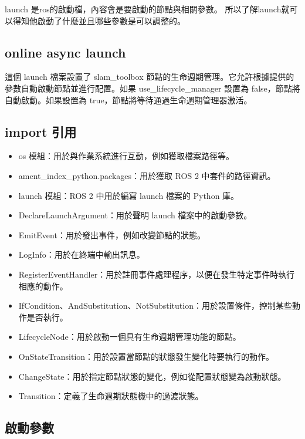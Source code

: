 launch 是ros的啟動檔，內容會是要啟動的節點與相關參數。
所以了解launch就可以得知他啟動了什麼並且哪些參數是可以調整的。
\subsection{online async launch}

這個 launch 檔案設置了 slam\_toolbox 節點的生命週期管理。它允許根據提供的參數自動啟動節點並進行配置。如果 use\_lifecycle\_manager 設置為 false，節點將自動啟動。如果設置為 true，節點將等待通過生命週期管理器激活。
\subsection{import 引用}
\begin{itemize}
    \item os 模組：用於與作業系統進行互動，例如獲取檔案路徑等。
    \item ament\_index\_python.packages：用於獲取 ROS 2 中套件的路徑資訊。
    \item launch 模組：ROS 2 中用於編寫 launch 檔案的 Python 庫。
    \item DeclareLaunchArgument：用於聲明 launch 檔案中的啟動參數。
    \item EmitEvent：用於發出事件，例如改變節點的狀態。
    \item LogInfo：用於在終端中輸出訊息。
    \item RegisterEventHandler：用於註冊事件處理程序，以便在發生特定事件時執行相應的動作。
    \item IfCondition、AndSubstitution、NotSubstitution：用於設置條件，控制某些動作是否執行。
    \item LifecycleNode：用於啟動一個具有生命週期管理功能的節點。
    \item OnStateTransition：用於設置當節點的狀態發生變化時要執行的動作。
    \item ChangeState：用於指定節點狀態的變化，例如從配置狀態變為啟動狀態。
    \item Transition：定義了生命週期狀態機中的過渡狀態。
\end{itemize}

\subsection{啟動參數}

